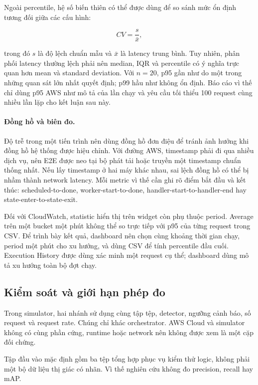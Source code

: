 Ngoài percentile, hệ số biến thiên có thể được dùng để so sánh mức ổn định tương
đối giữa các cấu hình:

\begin{equation}
CV = \frac{s}{\bar{x}},
\label{eq:coefficient-variation}
\end{equation}

trong đó $s$ là độ lệch chuẩn mẫu và $\bar{x}$ là latency trung bình. Tuy nhiên,
phân phối latency thường lệch phải nên median, IQR và percentile có ý nghĩa trực
quan hơn mean và standard deviation. Với $n=20$, p95 gần như do một trong những
quan sát lớn nhất quyết định; p99 hầu như không ổn định. Báo cáo vì thế chỉ dùng
p95 AWS như mô tả của lần chạy và yêu cầu tối thiểu 100 request cùng nhiều lần lặp
cho kết luận sau này.

\paragraph{Đồng hồ và biên đo.}

Độ trễ trong một tiến trình nên dùng đồng hồ đơn điệu để tránh ảnh hưởng khi đồng
hồ hệ thống được hiệu chỉnh. Với đường AWS, timestamp phải đi qua nhiều dịch vụ,
nên E2E được neo tại bộ phát tải hoặc truyền một timestamp chuẩn thống nhất. Nếu
lấy timestamp ở hai máy khác nhau, sai lệch đồng hồ có thể bị nhầm thành network
latency. Mỗi metric vì thế cần ghi rõ điểm bắt đầu và kết thúc: scheduled-to-done,
worker-start-to-done, handler-start-to-handler-end hay state-enter-to-state-exit.

Đối với CloudWatch, statistic hiển thị trên widget còn phụ thuộc period. Average
trên một bucket một phút không thể so trực tiếp với p95 của từng request trong CSV.
Để trình bày kết quả, dashboard nên chọn cùng khoảng thời gian chạy, period một
phút cho xu hướng, và dùng CSV để tính percentile đầu cuối. Execution History được
dùng xác minh một request cụ thể; dashboard dùng mô tả xu hướng toàn bộ đợt chạy.

\subsection{Kiểm soát và giới hạn phép đo}

Trong simulator, hai nhánh sử dụng cùng tập tệp, detector, ngưỡng cảnh báo, số
request và request rate. Chúng chỉ khác orchestrator. AWS Cloud và simulator không
có cùng phần cứng, runtime hoặc network nên không được xem là một cặp đối chứng.

Tập đầu vào mặc định gồm ba tệp tổng hợp phục vụ kiểm thử logic, không phải một bộ
dữ liệu thị giác có nhãn. Vì thế nghiên cứu không đo precision, recall hay mAP.

